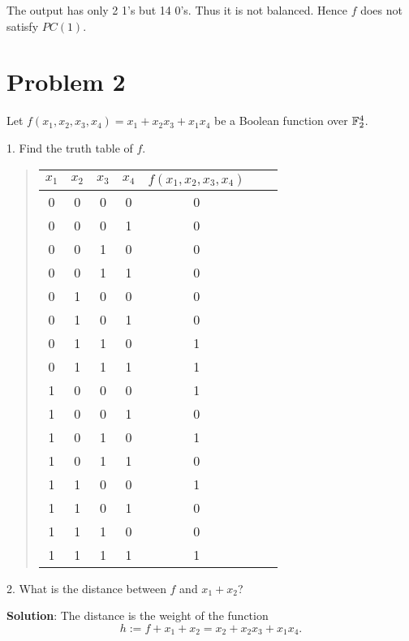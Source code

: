 \documentclass[12pt]{article}
\theoremstyle{plain}
\begin{document}
The output has only 2 1's but 14 0's. Thus it is not balanced. Hence $f$ does not satisfy $PC(1)$.

\section{Problem 2}
Let $f(x_1, x_2, x_3, x_4) = x_1 + x_2x_3 + x_1x_4$ be a Boolean function over $\mathbb{F}_2^4$.

1. Find the truth table of $f$.

\begin{quote}
\begin{tabular}{c c c c| c || c || c }
$x_1$ & $x_2$ & $x_3$ & $x_4$ & $f(x_1, x_2, x_3, x_4)$ \\
\hline
0 & 0 & 0 & 0 & 0 \\
0 & 0 & 0 & 1 & 0 \\
0 & 0 & 1 & 0 & 0 \\
0 & 0 & 1 & 1 & 0 \\
0 & 1 & 0 & 0 & 0 \\
0 & 1 & 0 & 1 & 0 \\
0 & 1 & 1 & 0 & 1 \\
0 & 1 & 1 & 1 & 1 \\
1 & 0 & 0 & 0 & 1 \\
1 & 0 & 0 & 1 & 0 \\
1 & 0 & 1 & 0 & 1 \\
1 & 0 & 1 & 1 & 0 \\
1 & 1 & 0 & 0 & 1 \\
1 & 1 & 0 & 1 & 0 \\
1 & 1 & 1 & 0 & 0 \\
1 & 1 & 1 & 1 & 1 \\
\end{tabular}
\end{quote}

2. What is the distance between $f$ and $x_1 + x_2$?

{\bf Solution}: The distance is the weight of the function
$$h := f+x_1 + x_2 = x_2 + x_2x_3 + x_1x_4.$$
\end{document}
